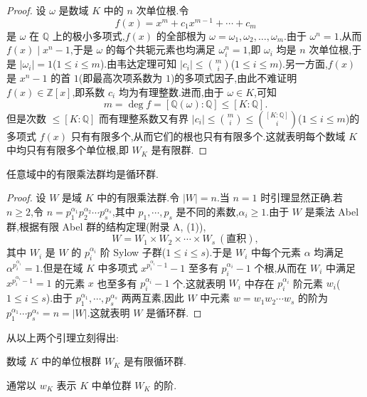 \begin{proof}
设 $\omega$ 是数域 $K$ 中的 $n$ 次单位根.令
\[
  f(x)=x^m+c_1x^{m-1}+\cdots+c_m
\]
是 $\omega$ 在 $\mathbb{Q}$ 上的极小多项式,$f(x)$ 的全部根为 $\omega=\omega_1,\omega_2,\ldots,\omega_m$.由于 $\omega^n=1$,从而 $f(x)\mid x^n-1$,于是 $\omega$ 的每个共轭元素也均满足 $\omega_i^n=1$,即 $\omega_i$ 均是 $n$ 次单位根,于是 $|\omega_i|=1$($1\leqslant i\leqslant m$).由韦达定理可知 $|c_i|\leqslant\binom{m}{i}$($1\leqslant i\leqslant m$).另一方面,$f(x)$ 是 $x^n-1$ 的首 $1$(即最高次项系数为 $1$)的多项式因子,由此不难证明 $f(x)\in\mathbb{Z}[x]$,即系数 $c_i$ 均为有理整数.进而,由于 $\omega\in K$,可知
\[
  m=\deg f=[\mathbb{Q}(\omega):\mathbb{Q}]\leqslant[K:\mathbb{Q}].
\]
但是次数 $\leqslant[K:\mathbb{Q}]$ 而有理整系数又有界 $|c_i|\leqslant\binom{m}{i}\leqslant\binom{[K:\mathbb{Q}]}{i}$($1\leqslant i\leqslant m$)的多项式 $f(x)$ 只有有限多个,从而它们的根也只有有限多个.这就表明每个数域 $K$ 中均只有有限多个单位根,即 $W_K$ 是有限群.
\end{proof}

\begin{lemma}\label{lem:ch1-5}
任意域中的有限乘法群均是循环群.
\end{lemma}

\begin{proof}
设 $W$ 是域 $K$ 中的有限乘法群.令 $|W|=n$.当 $n=1$ 时引理显然正确.若 $n\geqslant 2$,令 $n=p_1^{\alpha_1}p_2^{\alpha_2}\cdots p_s^{\alpha_s}$,其中 $p_1,\cdots,p_s$ 是不同的素数,$\alpha_i\geqslant 1$.由于 $W$ 是乘法 Abel 群,根据有限 Abel 群的结构定理(附录 A, (1)),
\[
  W=W_1\times W_2\times\cdots\times W_s\ (\text{直积}),
\]
其中 $W_i$ 是 $W$ 的 $p_i^{\alpha_i}$ 阶 Sylow 子群($1\leqslant i\leqslant s$).于是 $W_i$ 中每个元素 $\alpha$ 均满足 $\alpha^{p_i^{\alpha_i}}=1$.但是在域 $K$ 中多项式 $x^{p_i^{\alpha_i}-1}-1$ 至多有 $p_i^{\alpha_i}-1$ 个根,从而在 $W_i$ 中满足 $x^{p_i^{\alpha_i}-1}=1$ 的元素 $x$ 也至多有 $p_i^{\alpha_i}-1$ 个.这就表明 $W_i$ 中存在 $p_i^{\alpha_i}$ 阶元素 $w_i$($1\leqslant i\leqslant s$).由于 $p_1^{\alpha_1},\cdots,p_s^{\alpha_s}$ 两两互素,因此 $W$ 中元素 $w=w_1w_2\cdots w_s$ 的阶为 $p_1^{\alpha_1}\cdots p_s^{\alpha_s}=n=|W|$.这就表明 $W$ 是循环群.
\end{proof}

从以上两个引理立刻得出:

\begin{theorem}\label{thm:1.5}
数域 $K$ 中的单位根群 $W_K$ 是有限循环群.
\end{theorem}

通常以 $w_K$ 表示 $K$ 中单位群 $W_K$ 的阶.

